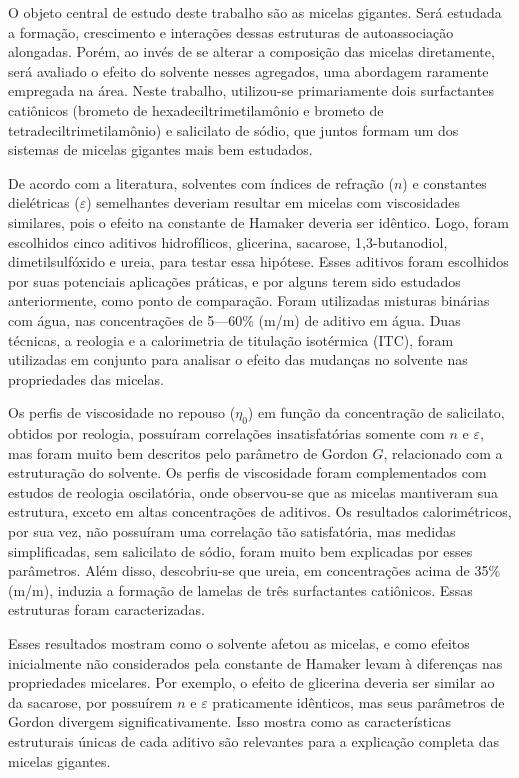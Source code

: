 \documentclass[
	12pt,				%
	oneside,
	a4paper,			%
	english,			%
	brazil%
	]{abntex2}
\begin{document}
\setlength{\absparsep}{18pt} %
\begin{resumo}
 	O objeto central de estudo deste trabalho são as micelas gigantes. Será estudada a formação, crescimento e interações dessas estruturas de autoassociação alongadas. Porém, ao invés de se alterar a composição das micelas diretamente, será avaliado o efeito do solvente nesses agregados, uma abordagem raramente empregada na área. Neste trabalho, utilizou-se primariamente dois surfactantes catiônicos (brometo de hexadeciltrimetilamônio e brometo de tetradeciltrimetilamônio) e salicilato de sódio, que juntos formam um dos sistemas de micelas gigantes mais bem estudados.
 	
	De acordo com a literatura, solventes com índices de refração (\(n\)) e constantes dielétricas (\(\varepsilon\)) semelhantes deveriam resultar em micelas com viscosidades similares, pois o efeito na constante de Hamaker deveria ser idêntico. Logo, foram escolhidos cinco aditivos hidrofílicos, glicerina, sacarose, 1,3-butanodiol, dimetilsulfóxido e ureia, para testar essa hipótese. Esses aditivos foram escolhidos por suas potenciais aplicações práticas, e por alguns terem sido estudados anteriormente, como ponto de comparação. Foram utilizadas misturas binárias com água, nas concentrações de 5---60\% (m/m) de aditivo em água. Duas técnicas, a reologia e a calorimetria de titulação isotérmica (ITC), foram utilizadas em conjunto para analisar o efeito das mudanças no solvente nas propriedades das micelas. 
	
	Os perfis de viscosidade no repouso (\(\eta_0\)) em função da concentração de salicilato, obtidos por reologia, possuíram correlações insatisfatórias somente com \(n\) e \(\varepsilon\), mas foram muito bem descritos pelo parâmetro de Gordon \(G\), relacionado com a estruturação do solvente. Os perfis de viscosidade foram complementados com estudos de reologia oscilatória, onde observou-se que as micelas mantiveram sua estrutura, exceto em altas concentrações de aditivos. Os resultados calorimétricos, por sua vez, não possuíram uma correlação tão satisfatória, mas medidas simplificadas, sem salicilato de sódio, foram muito bem explicadas por esses parâmetros. Além disso, descobriu-se que ureia, em concentrações acima de 35\% (m/m), induzia a formação de lamelas de três surfactantes catiônicos. Essas estruturas foram caracterizadas.
	
	Esses resultados mostram como o solvente afetou as micelas, e como efeitos inicialmente não considerados pela constante de Hamaker levam à diferenças nas propriedades micelares. Por exemplo, o efeito de glicerina deveria ser similar ao da sacarose, por possuírem \(n\) e \(\varepsilon\) praticamente idênticos, mas seus parâmetros de Gordon divergem significativamente. Isso mostra como as características estruturais únicas de cada aditivo são relevantes para a explicação completa das micelas gigantes.
	

\end{resumo}
\end{document}
